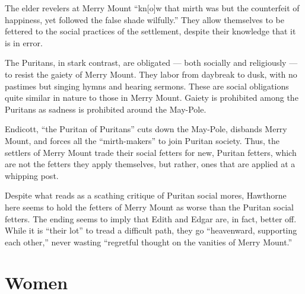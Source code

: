 \documentclass[man,12pt,natbib]{apa6}
\begin{document}
The elder revelers at Merry Mount ``kn[o]w that mirth was but the counterfeit
of happiness, yet followed the false shade wilfully.'' They allow themselves to
be fettered to the social practices of the settlement, despite their knowledge
that it is in error.

The Puritans, in stark contrast, are obligated --- both socially and
religiously --- to resist the gaiety of Merry Mount. They labor from daybreak
to dusk, with no pastimes but singing hymns and hearing sermons. These are
social obligations quite similar in nature to those in Merry Mount. Gaiety is
prohibited among the Puritans as sadness is prohibited around the May-Pole.

Endicott, ``the Puritan of Puritans'' cuts down the May-Pole, disbands Merry
Mount, and forces all the ``mirth-makers'' to join Puritan society. Thus, the
settlers of Merry Mount trade their social fetters for new, Puritan fetters,
which are not the fetters they apply themselves, but rather, ones that are
applied at a whipping post.

Despite what reads as a scathing critique of Puritan social mores, Hawthorne
here seems to hold the fetters of Merry Mount as worse than the Puritan social
fetters. The ending seems to imply that Edith and Edgar are, in fact, better
off. While it is ``their lot'' to tread a difficult path, they go ``heavenward,
supporting each other,'' never wasting ``regretful thought on the vanities of
Merry Mount.''

\nocite{Thoreau12, Melville12, Hawthorne12a}

\clearpage

\section{Women}

\end{document}
